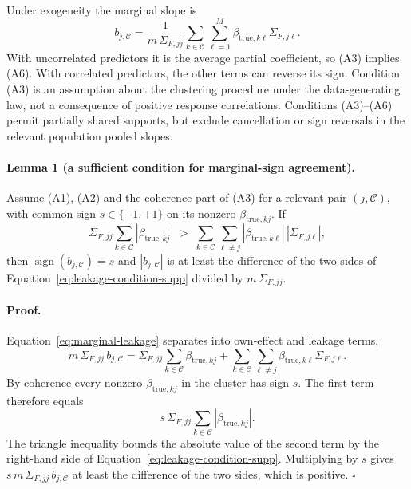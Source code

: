 \documentclass[11pt,a4paper]{article}
\begin{document}
Under exogeneity the marginal slope is
\begin{equation}\label{eq:marginal-leakage}
 b_{j,\mathcal C}
 =\frac{1}{m\,\Sigma_{F,jj}}
 \sum_{k\in\mathcal C}\sum_{\ell=1}^M
 \beta_{\mathrm{true},k\ell}\Sigma_{F,j\ell}.
\end{equation}
With uncorrelated predictors it is the average partial coefficient, so (A3)
implies (A6). With correlated predictors, the other terms can reverse its sign.
Condition (A3) is an assumption about the clustering procedure under the
data-generating law, not a consequence of positive response correlations.
Conditions (A3)--(A6) permit partially shared supports, but exclude cancellation
or sign reversals in the relevant population pooled slopes.

\paragraph{Lemma 1 (a sufficient condition for marginal-sign agreement).}
\label{lem:leakage-supp}
Assume (A1), (A2) and the coherence part of (A3) for a relevant pair
$(j,\mathcal C)$, with common sign $s\in\{-1,+1\}$ on its nonzero
$\beta_{\mathrm{true},kj}$. If
\begin{equation}\label{eq:leakage-condition-supp}
 \Sigma_{F,jj}\sum_{k\in\mathcal C}|\beta_{\mathrm{true},kj}|
 \;>\;
 \sum_{k\in\mathcal C}\sum_{\ell\ne j}
 |\beta_{\mathrm{true},k\ell}|\,|\Sigma_{F,j\ell}| ,
\end{equation}
then $\operatorname{sign}(b_{j,\mathcal C})=s$ and $|b_{j,\mathcal C}|$ is at
least the difference of the two sides of
Equation~\eqref{eq:leakage-condition-supp} divided by $m\,\Sigma_{F,jj}$.

\paragraph{Proof.}
Equation~\eqref{eq:marginal-leakage} separates into own-effect and leakage
terms,
\[
 m\,\Sigma_{F,jj}\,b_{j,\mathcal C}
 =\Sigma_{F,jj}\sum_{k\in\mathcal C}\beta_{\mathrm{true},kj}
 +\sum_{k\in\mathcal C}\sum_{\ell\ne j}\beta_{\mathrm{true},k\ell}\Sigma_{F,j\ell}.
\]
By coherence every nonzero $\beta_{\mathrm{true},kj}$ in the cluster has sign
$s$. The first term therefore equals
\[
 s\,\Sigma_{F,jj}\sum_{k\in\mathcal C}|\beta_{\mathrm{true},kj}| .
\]
The triangle inequality bounds the absolute value of the second term by the
right-hand side of Equation~\eqref{eq:leakage-condition-supp}. Multiplying by
$s$ gives $s\,m\,\Sigma_{F,jj}\,b_{j,\mathcal C}$ at least the difference of the
two sides, which is positive.
\hfill$\square$
\end{document}
